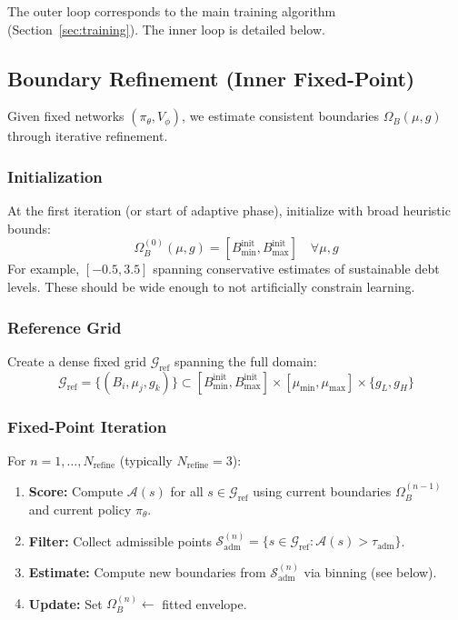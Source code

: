 The outer loop corresponds to the main training algorithm (Section~\ref{sec:training}). The inner loop is detailed below.


\subsection{Boundary Refinement (Inner Fixed-Point)}\label{sec:boundary_learning}

Given fixed networks $(\pi_\theta, V_\phi)$, we estimate consistent boundaries $\Omega_B(\mu, g)$ through iterative refinement.

\subsubsection{Initialization}
At the first iteration (or start of adaptive phase), initialize with broad heuristic bounds:
\begin{equation}
    \Omega_B^{(0)}(\mu, g) = [B^{\text{init}}_{\min}, B^{\text{init}}_{\max}] \quad \forall \mu, g
\end{equation}
For example, $[-0.5, 3.5]$ spanning conservative estimates of sustainable debt levels. These should be wide enough to not artificially constrain learning.

\subsubsection{Reference Grid}
Create a dense fixed grid $\mathcal{G}_{\text{ref}}$ spanning the full domain:
\begin{equation}
    \mathcal{G}_{\text{ref}} = \{(B_i, \mu_j, g_k)\} \subset [B_{\min}^{\text{init}}, B_{\max}^{\text{init}}] \times [\mu_{\min}, \mu_{\max}] \times \{g_L, g_H\}
\end{equation}

\subsubsection{Fixed-Point Iteration}
For $n = 1, \ldots, N_{\text{refine}}$ (typically $N_{\text{refine}} = 3$):
\begin{enumerate}
    \item \textbf{Score:} Compute $\mathcal{A}(s)$ for all $s \in \mathcal{G}_{\text{ref}}$ using current boundaries $\Omega_B^{(n-1)}$ and current policy $\pi_\theta$.
    \item \textbf{Filter:} Collect admissible points $\mathcal{S}_{\text{adm}}^{(n)} = \{s \in \mathcal{G}_{\text{ref}} : \mathcal{A}(s) > \tau_{\text{adm}}\}$.
    \item \textbf{Estimate:} Compute new boundaries from $\mathcal{S}_{\text{adm}}^{(n)}$ via binning (see below).
    \item \textbf{Update:} Set $\Omega_B^{(n)} \leftarrow$ fitted envelope.
\end{enumerate}

